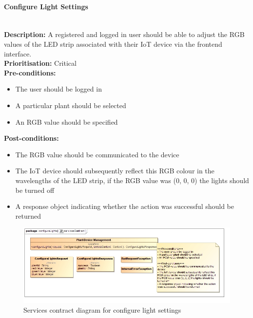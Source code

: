 \documentclass{article}
\begin{document}
\paragraph{Configure Light Settings}\mbox{}\\
\textbf{Description:} A registered and logged in user should be able to adjust the RGB values of the LED strip associated with their IoT device via the frontend interface.\\
\textbf{Prioritisation:} Critical\\		
\textbf{Pre-conditions:}
\begin{itemize}
	\item The user should be logged in
	\item A particular plant should be selected
	\item An RGB value should be specified
\end{itemize}
\textbf{Post-conditions:}
\begin{itemize}
	\item The RGB value should be communicated to the device
	\item The IoT device should subsequently reflect this RGB colour in the wavelengths of the LED strip, if the RGB value was (0, 0, 0) the lights should be turned off
	\item A response object indicating whether the action was successful should be returned
\end{itemize}

\begin{figure}[H]
	\includegraphics[width=\linewidth]{images/ServicesContracts/configureLights.jpg}
	\caption{Services contract diagram for configure light settings}
\end{figure}
\end{document}
